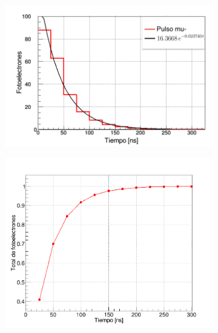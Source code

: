 \documentclass[12pt,oneside,openany,letter]{book}
\begin{document}
\begin{figure}[h!]
    \centering
    \begin{subfigure}{0.45\textwidth}
        \includegraphics[width=\textwidth]{vem_tiempo.png}
        \caption{}
        \label{vem_tiempo}
    \end{subfigure}
     \begin{subfigure}{0.4\textwidth}
        \includegraphics[width=\textwidth]{VEMcum.png}
        \caption{}
        \label{VEMcum}
    \end{subfigure}
    \begin{subfigure}{0.45\textwidth}

\end{subfigure}
\end{figure}
\end{document}
